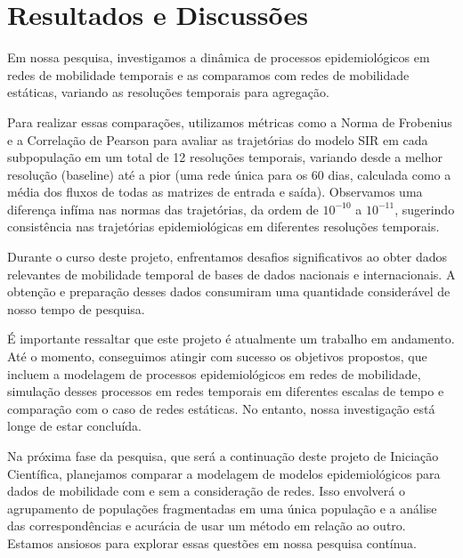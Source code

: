 \chapter{Resultados e Discussões}

Em nossa pesquisa, investigamos a dinâmica de processos epidemiológicos em redes de mobilidade temporais e as comparamos com redes de mobilidade estáticas, variando as resoluções temporais para agregação.

Para realizar essas comparações, utilizamos métricas como a Norma de Frobenius \cite{Demmel1997} e a Correlação de Pearson \cite{Moretin2017} para avaliar as trajetórias do modelo SIR em cada subpopulação em um total de 12 resoluções temporais, variando desde a melhor resolução (baseline) até a pior (uma rede única para os 60 dias, calculada como a média dos fluxos de todas as matrizes de entrada e saída). Observamos uma diferença infíma nas normas das trajetórias, da ordem de $10^{-10}$ a $10^{-11}$, sugerindo consistência nas trajetórias epidemiológicas em diferentes resoluções temporais.

Durante o curso deste projeto, enfrentamos desafios significativos ao obter dados relevantes de mobilidade temporal de bases de dados nacionais e internacionais. A obtenção e preparação desses dados consumiram uma quantidade considerável de nosso tempo de pesquisa.

É importante ressaltar que este projeto é atualmente um trabalho em andamento. Até o momento, conseguimos atingir com sucesso os objetivos propostos, que incluem a modelagem de processos epidemiológicos em redes de mobilidade, simulação desses processos em redes temporais em diferentes escalas de tempo e comparação com o caso de redes estáticas. No entanto, nossa investigação está longe de estar concluída.

Na próxima fase da pesquisa, que será a continuação deste projeto de Iniciação Científica, planejamos comparar a modelagem de modelos epidemiológicos para dados de mobilidade com e sem a consideração de redes. Isso envolverá o agrupamento de populações fragmentadas em uma única população e a análise das correspondências e acurácia de usar um método em relação ao outro. Estamos ansiosos para explorar essas questões em nossa pesquisa contínua.